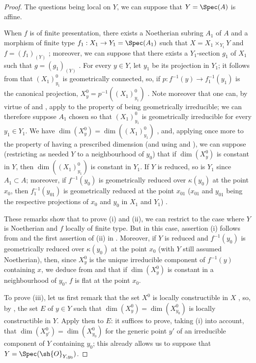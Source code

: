 \begin{proof}
The questions being local on $Y$, we can suppose that $Y=\Spec(A)$ is affine.

When $f$ is of finite presentation, there exists a Noetherian subring $A_1$ of $A$ and a morphism of finite type $f_1:X_1\to Y_1=\Spec(A_1)$ such that $X=X_1\times_{Y_1}Y$ and $f=(f_1)_{(Y)}$ ; moreover, we can suppose that there exists a $Y_1$-section $g_1$ of $X_1$ such that $g=(g_1)_{(Y)}$ .
For every $y\in Y$, let $y_1$ be its projection in $Y_1$; it follows from  that $(X_1)_{y_1}^0$ is geometrically connected, so, if $p:f^{-1}(y)\to f_1^{-1}(y_1)$ is the canonical projection, $X_y^0=p^{-1}((X_1)_{y_1}^0)$ .
Note moreover that one can, by virtue of  and , apply  to the property of being geometrically irreducible; we can therefore suppose $A_1$ chosen so that $(X_1)_{y_1}^0$ is geometrically irreducible for every $y_1\in Y_1$.
We have $\dim(X_y^0)=\dim((X_1)_{y_1}^0)$ , and, applying  once more to the property of having a prescribed dimension (and using  and ), we can suppose (restricting as needed $Y$ to a neighbourhood of $y_0$) that if $\dim(X_y^0)$ is constant in $Y$, then $\dim((X_1)_{y_1}^0)$ is constant in $Y_1$.
If $Y$ is reduced, so is $Y_1$ since $A_1\subset A$; moreover, if $f^{-1}(y_0)$ is geometrically reduced over $\kappa(y_0)$ at the point $x_0$, then $f_1^{-1}(y_{01})$ is geometrically reduced at the point $x_{01}$ ($x_{01}$ and $y_{01}$ being the respective projections of $x_0$ and $y_0$ in $X_1$ and $Y_1$) .

These remarks show that to prove (i) and (ii), we can restrict to the case where $Y$ is Noetherian and $f$ locally of finite type.
But in this case, assertion (i) follows from  and the first assertion of (ii) in .
Moreover, if $Y$ is reduced and $f^{-1}(y_0)$ is geometrically reduced over $\kappa(y_0)$ at the point $x_0$ (with $Y$ still assumed Noetherian), then, since $X_y^0$ is the unique irreducible component of $f^{-1}(y)$ containing $x$, we
deduce from  and  that if $\dim(X_y^0)$ is constant in a neighbourhood of $y_0$, $f$ is flat at the point $x_0$.

To prove (iii), let us first remark that the set $X^0$ is locally constructible in $X$ , so, by , the set $E$ of $y\in Y$ such that $\dim(X_y^0)=\dim(X_{y_0}^0)$ is locally constructible in $Y$.
Apply then  to $E$: it suffices to prove, taking (i) into account, that $\dim(X_{y'}^0)=\dim(X_{y_0}^0)$ for the generic point $y'$ of an irreducible component of $Y$ containing $y_0$; this already allows us to suppose that $Y=\Spec(\sh{O}_{Y,y_0})$.


\end{proof}
